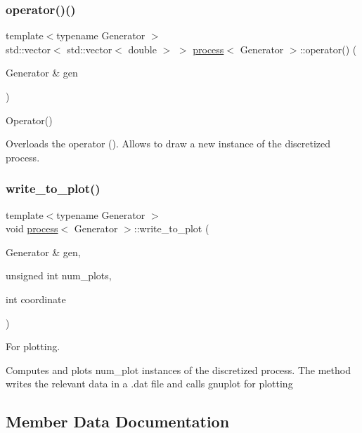 \subsubsection{\texorpdfstring{operator()()}{operator()()}}
{\footnotesize\ttfamily template$<$typename Generator $>$ \\
std\+::vector$<$ std\+::vector$<$ double $>$ $>$ \mbox{\hyperlink{classprocess}{process}}$<$ Generator $>$\+::operator() (\begin{DoxyParamCaption}\item[{Generator \&}]{gen }\end{DoxyParamCaption})}



Operator() 

Overloads the operator (). Allows to draw a new instance of the discretized process. \mbox{\label{classprocess_a5fc8d61bdb3373b5f1a2b123bd8b2556}} 
\subsubsection{\texorpdfstring{write\+\_\+to\+\_\+plot()}{write\_to\_plot()}}
{\footnotesize\ttfamily template$<$typename Generator $>$ \\
void \mbox{\hyperlink{classprocess}{process}}$<$ Generator $>$\+::write\+\_\+to\+\_\+plot (\begin{DoxyParamCaption}\item[{Generator \&}]{gen,  }\item[{unsigned int}]{num\+\_\+plots,  }\item[{int}]{coordinate }\end{DoxyParamCaption})}



For plotting. 

Computes and plots num\+\_\+plot instances of the discretized process. The method writes the relevant data in a .dat file and calls gnuplot for plotting 

\subsection{Member Data Documentation}
\mbox{\label{classprocess_a90acfc839d6d7465c4aa311bb6970788}} 
